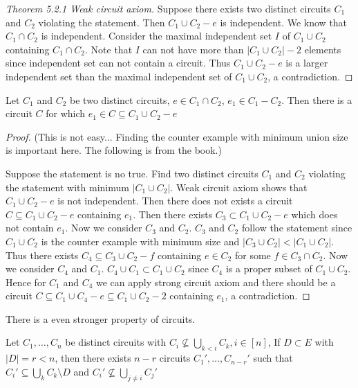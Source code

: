 \documentclass[12pt]{article}
\begin{document}
\begin{proof}[Theorem 5.2.1 Weak circuit axiom]
    Suppose there exists two distinct circuits $C_1$ and $C_2$ violating the statement. Then $C_1\cup C_2-e$ is independent. We know that $C_1\cap C_2$ is independent. Consider the maximal independent set $I$ of $C_1\cup C_2$ containing $C_1\cap C_2$. Note that $I$ can not have more than $|C_1\cup C_2|-2$ elements since independent set can not contain a circuit. Thus $C_1\cup C_2 -e$ is a larger independent set than the maximal independent set of $C_1\cup C_2$, a contradiction.
\end{proof}

\begin{theorem}\label{thm:strongcircuit}
    Let $C_1$ and $C_2$ be two distinct circuits, $e\in C_1\cap C_2$, $e_1 \in C_1 - C_2$. Then
there is a circuit $C$ for which $e_1\in C\subseteq C_1\cup C_2 -e$
\end{theorem}
\begin{proof}
    (This is not easy... Finding the counter example with minimum union size is important here. The following is from the book.)

    Suppose the statement is no true.
    Find two distinct circuits $C_1$ and $C_2$ violating the statement with minimum $|C_1\cup C_2|$. Weak circuit axiom shows that $C_1 \cup C_2 -e$ is not independent. Then there does not exists a circuit $C\subseteq C_1\cup C_2 -e$ containing $e_1$. Then there exists $C_3\subset C_1\cup C_2 -e$ which does not contain $e_1$. Now we consider $C_3$ and $C_2$. $C_3$ and $C_2$ follow the statement since $C_1\cup C_2$ is the counter example with minimum size and $|C_3\cup C_2|<|C_1\cup C_2|$. Thus there exists $C_4 \subseteq C_3\cup C_2 -f$ containing $e\in C_2$ for some $f\in C_3\cap C_2$. Now we consider $C_4$ and $C_1$. $C_4\cup C_1 \subset C_1 \cup C_2$ since $C_4$ is a proper subset of $C_1\cup C_2$. Hence for $C_1$ and $C_4$ we can apply strong circuit axiom and there should be a circuit $C\subseteq C_1\cup C_4 -e\subseteq C_1\cup C_2-2$ containing $e_1$, a contradiction.
\end{proof}
There is a even stronger property of circuits.

\begin{lemma}\label{lem:asche}
    Let $C_1,\ldots,C_n$ be distinct circuits with $C_i\not\subseteq \bigcup_{k<i}C_k,i\in [n]$, If $D\subset E$ with $|D|=r<n$, then there exists $n-r$ circuits $C_1',\ldots,C_{n-r}'$ such that $C_i'\subseteq\bigcup_{k}C_k\setminus D$ and $C_i'\not\subseteq \bigcup_{j\not=i}C_j'$
\end{lemma}
\end{document}
